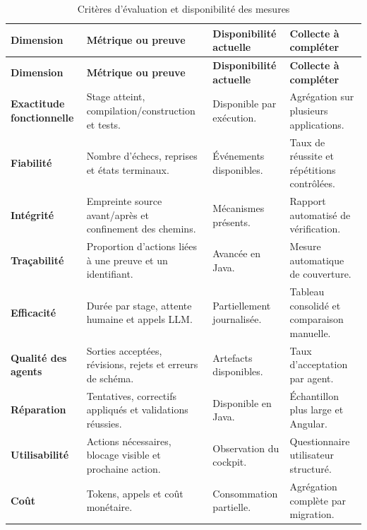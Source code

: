 \scriptsize
\begin{longtable}{|>{\bfseries\RaggedRight\arraybackslash}p{2.8cm}|>{\RaggedRight\arraybackslash}p{4.3cm}|>{\RaggedRight\arraybackslash}p{3.5cm}|>{\RaggedRight\arraybackslash}p{3.6cm}|}
    \caption{Critères d'évaluation et disponibilité des mesures}\label{tab:metriques-ch5}\\
    \hline
    \rowcolor{cgilight!95}
    \textbf{Dimension} & \textbf{Métrique ou preuve} & \textbf{Disponibilité actuelle} & \textbf{Collecte à compléter} \\
    \hline
    \endfirsthead
    \hline
    \rowcolor{cgilight!95}
    \textbf{Dimension} & \textbf{Métrique ou preuve} & \textbf{Disponibilité actuelle} & \textbf{Collecte à compléter} \\
    \hline
    \endhead
    Exactitude fonctionnelle & Stage atteint, compilation/construction et tests. & Disponible par exécution. & Agrégation sur plusieurs applications. \\
    \hline
    Fiabilité & Nombre d'échecs, reprises et états terminaux. & Événements disponibles. & Taux de réussite et répétitions contrôlées. \\
    \hline
    Intégrité & Empreinte source avant/après et confinement des chemins. & Mécanismes présents. & Rapport automatisé de vérification. \\
    \hline
    Traçabilité & Proportion d'actions liées à une preuve et un identifiant. & Avancée en Java. & Mesure automatique de couverture. \\
    \hline
    Efficacité & Durée par stage, attente humaine et appels LLM. & Partiellement journalisée. & Tableau consolidé et comparaison manuelle. \\
    \hline
    Qualité des agents & Sorties acceptées, révisions, rejets et erreurs de schéma. & Artefacts disponibles. & Taux d'acceptation par agent. \\
    \hline
    Réparation & Tentatives, correctifs appliqués et validations réussies. & Disponible en Java. & Échantillon plus large et Angular. \\
    \hline
    Utilisabilité & Actions nécessaires, blocage visible et prochaine action. & Observation du cockpit. & Questionnaire utilisateur structuré. \\
    \hline
    Coût & Tokens, appels et coût monétaire. & Consommation partielle. & Agrégation complète par migration. \\
    \hline
\end{longtable}
\normalsize

